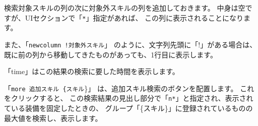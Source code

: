 \documentclass[dvipdfmx]{jsarticle}
\begin{document}
検索対象スキルの列の次に対象外スキルの列を追加しておきます。
中身は空ですが、UIセクションで「\texttt{*}」指定があれば、
この列に表示されることになります。

また、「\texttt{newcolumn !対象外スキル}」
のように、文字列先頭に「!」がある場合は、
既に前の列から移動してきたものがあっても、1行目に表示します。

\begin{center}
\end{center}

「time」はこの結果の検索に要した時間を表示します。

「\texttt{more 追加スキル \{スキル}\}」
は、追加スキル検索のボタンを配置します。
これをクリックすると、
この検索結果の見出し部分で「\texttt{n*}」と指定され、表示されている装備を固定したときの、
グループ「\{スキル\}」に登録されているものの最大値を検索し、表示します。


\begin{center}
\end{center}
\end{document}
